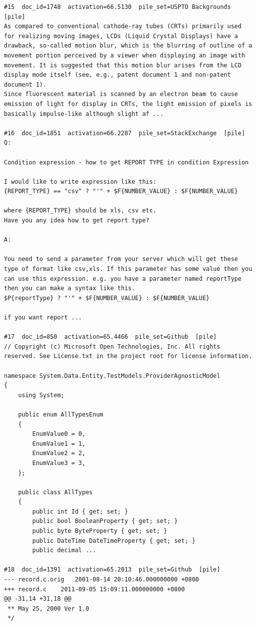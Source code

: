 \begin{verbatim}
#15  doc_id=1748  activation=66.5130  pile_set=USPTO Backgrounds  [pile]
As compared to conventional cathode-ray tubes (CRTs) primarily used for realizing moving images, LCDs (Liquid Crystal Displays) have a drawback, so-called motion blur, which is the blurring of outline of a movement portion perceived by a viewer when displaying an image with movement. It is suggested that this motion blur arises from the LCD display mode itself (see, e.g., patent document 1 and non-patent document 1).
Since fluorescent material is scanned by an electron beam to cause emission of light for display in CRTs, the light emission of pixels is basically impulse-like although slight af ...

#16  doc_id=1851  activation=66.2287  pile_set=StackExchange  [pile]
Q:

Condition expression - how to get REPORT TYPE in condition Expression

I would like to write expression like this:
{REPORT_TYPE} == "csv" ? "'" + $F{NUMBER_VALUE} : $F{NUMBER_VALUE}

where {REPORT_TYPE} should be xls, csv etc.
Have you any idea how to get report type?

A:

You need to send a parameter from your server which will get these type of format like csv,xls. If this parameter has some value then you can use this expression. e.g. you have a parameter named reportType then you can make a syntax like this.
$P{reportType} ? "'" + $F{NUMBER_VALUE} : $F{NUMBER_VALUE}

if you want report ...

#17  doc_id=850  activation=65.4466  pile_set=Github  [pile]
﻿// Copyright (c) Microsoft Open Technologies, Inc. All rights reserved. See License.txt in the project root for license information.

namespace System.Data.Entity.TestModels.ProviderAgnosticModel
{
    using System;

    public enum AllTypesEnum
    {
        EnumValue0 = 0,
        EnumValue1 = 1,
        EnumValue2 = 2,
        EnumValue3 = 3,
    };

    public class AllTypes
    {
        public int Id { get; set; }
        public bool BooleanProperty { get; set; }
        public byte ByteProperty { get; set; }
        public DateTime DateTimeProperty { get; set; }
        public decimal ...

#18  doc_id=1391  activation=65.2013  pile_set=Github  [pile]
--- record.c.orig	2001-08-14 20:10:46.000000000 +0800
+++ record.c	2011-09-05 15:09:11.000000000 +0800
@@ -31,14 +31,18 @@
 **	May 25, 2000 Ver 1.0
 */
 

\end{verbatim}
